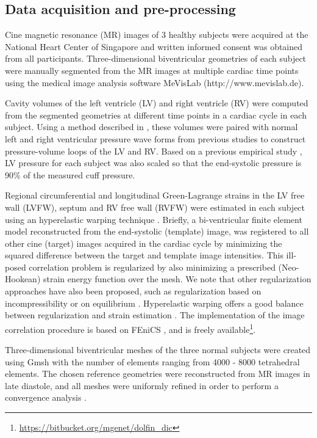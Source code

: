 \subsection{Data acquisition and pre-processing}

Cine magnetic resonance (MR) images of 3 healthy subjects were
acquired at the National Heart Center of Singapore and written
informed consent was obtained from all participants.
Three-dimensional biventricular geometries of each subject were
manually segmented from the MR images at multiple cardiac time points
using the medical image analysis software MeVisLab
(http://www.mevislab.de).


Cavity volumes of the left ventricle (LV) and right ventricle (RV)
were computed from the segmented geometries at different time points
in a cardiac cycle in each subject. Using a method described in
\citep{xi2016patient}, these volumes were paired with normal left and
right ventricular pressure wave forms from previous studies
\citep{Redington1988} to construct pressure-volume loops of the LV and
RV. Based on a previous empirical study \citep{Kelly1992a}, LV pressure
for each subject was also scaled so that the end-systolic pressure is
90\% of the measured cuff pressure.


Regional circumferential and longitudinal Green-Lagrange strains in
the LV free wall (LVFW), septum and RV free wall (RVFW) were estimated
in each subject using an hyperelastic warping technique \citep{Veress2005JBE, Genet20162AMISMRMI}.
Briefly, a bi-ventricular finite element model reconstructed from the end-systolic
(template) image, was registered to all other cine (target) images
acquired in the cardiac cycle by minimizing the squared difference
between the target and template image intensities. 
This ill-posed correlation problem is regularized by also minimizing a
prescribed (Neo-Hookean) strain energy function over the mesh. We note
that other regularization approaches have also been proposed, such as
regularization  based on incompressibility \citep{Mansi2011IJCV} or on equilibrium
\citep{Claire2004IJNME, Genet2017S}. Hyperelastic warping
offers a good balance between regularization and strain estimation
\citep{Genet20162AMISMRMI}. 
The implementation of the image correlation procedure is based on FEniCS
\citep{Alnaes2015}, and is freely
available\footnote{\url{https://bitbucket.org/mgenet/dolfin_dic}}.

Three-dimensional biventricular meshes of the three normal subjects were created
using Gmsh \citep{geuzaine2009gmsh} with the number of elements ranging from 4000 - 8000
tetrahedral elements. The chosen reference geometries were reconstructed
from MR images in late diastole, and all meshes were uniformly refined
in order to perform a convergence analysis .


